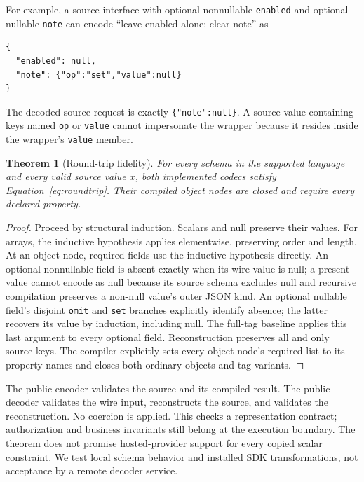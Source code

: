 \documentclass[10pt,twocolumn]{article}
\newtheorem{theorem}{Theorem}
\begin{document}
For example, a source interface with optional nonnullable \texttt{enabled} and optional nullable \texttt{note} can encode ``leave enabled alone; clear note'' as
\begin{lstlisting}
{
  "enabled": null,
  "note": {"op":"set","value":null}
}
\end{lstlisting}
The decoded source request is exactly \texttt{\{"note":null\}}. A source value containing keys named \texttt{op} or \texttt{value} cannot impersonate the wrapper because it resides inside the wrapper's \texttt{value} member.

\begin{theorem}[Round-trip fidelity]\label{thm:codec}
For every schema in the supported language and every valid source value $x$, both implemented codecs satisfy Equation~\ref{eq:roundtrip}. Their compiled object nodes are closed and require every declared property.
\end{theorem}
\begin{proof}
Proceed by structural induction. Scalars and null preserve their values. For arrays, the inductive hypothesis applies elementwise, preserving order and length. At an object node, required fields use the inductive hypothesis directly. An optional nonnullable field is absent exactly when its wire value is null; a present value cannot encode as null because its source schema excludes null and recursive compilation preserves a non-null value's outer JSON kind. An optional nullable field's disjoint \texttt{omit} and \texttt{set} branches explicitly identify absence; the latter recovers its value by induction, including null. The full-tag baseline applies this last argument to every optional field. Reconstruction preserves all and only source keys. The compiler explicitly sets every object node's required list to its property names and closes both ordinary objects and tag variants.
\end{proof}

The public encoder validates the source and its compiled result. The public decoder validates the wire input, reconstructs the source, and validates the reconstruction. No coercion is applied. This checks a representation contract; authorization and business invariants still belong at the execution boundary. The theorem does not promise hosted-provider support for every copied scalar constraint. We test local schema behavior and installed SDK transformations, not acceptance by a remote decoder service.
\end{document}
